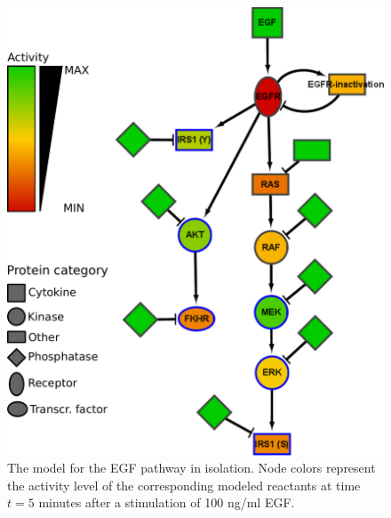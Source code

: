\documentclass{bmcart}
\begin{document}
\begin{figure}[!tpb]
\begin{minipage}{\textwidth}
\centering
  \includegraphics[width=.7\textwidth]{images/large_network_egf3}
\caption{The model for the EGF pathway in isolation. Node colors represent the
activity level of the corresponding modeled reactants at time $t = 5$ minutes after
a stimulation of 100 ng/ml EGF.}\label{fig:large-model-egf}
\end{minipage}
\end{figure}
\end{document}
